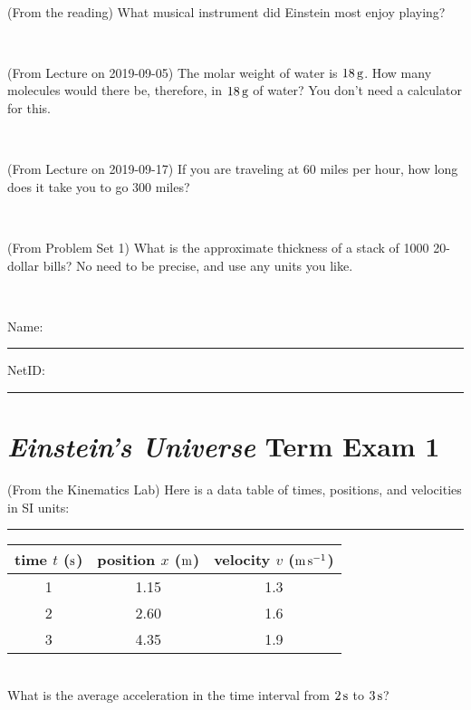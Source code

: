 \documentclass[12pt, letterpaper]{article}
\begin{document}
\vfill ~


\clearpage


\begin{problem} (From the reading)
What musical instrument did Einstein most enjoy playing?
\end{problem}


\vfill ~

\begin{problem} (From Lecture on 2019-09-05)
The molar weight of water is $18\,\mathrm{g}$. How many molecules would there
be, therefore, in $18\,\mathrm{g}$ of water? You don't need a calculator for
this.
\end{problem}


\vfill ~

\begin{problem} (From Lecture on 2019-09-17)
If you are traveling at 60 miles per hour, how long does
it take you to go 300 miles?
\end{problem}


\vfill ~

\begin{problem} (From Problem Set 1)
What is the approximate thickness of a stack of 1000 20-dollar bills?
No need to be precise, and use any units you like.
\end{problem}


\vfill ~


\cleardoublepage



\noindent
Name: \rule[-1ex]{0.60\textwidth}{0.1pt}
NetID: \rule[-1ex]{0.20\textwidth}{0.1pt}

\section*{\textsl{Einstein's Universe} Term Exam 1}
\setcounter{problem}{1}


\begin{problem} (From the Kinematics Lab)
Here is a data table of times, positions, and velocities in SI units:\\
\rule{1.0in}{0pt}\begin{tabular}{c|c|c}
time $t$ ($\mathrm{s}$) & position $x$ ($\mathrm{m}$) & velocity $v$ ($\mathrm{m}\,\mathrm{s}^{-1}$) \\
\hline
1 & 1.15 & 1.3 \\
2 & 2.60 & 1.6 \\
3 & 4.35 & 1.9 \\
\hline
\end{tabular}\\
What is the average acceleration in the time interval from $2\,\mathrm{s}$ to $3\,\mathrm{s}$?
\end{problem}
\end{document}
